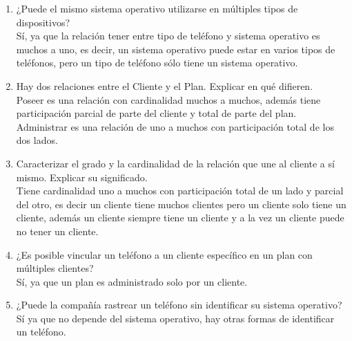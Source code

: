 \documentclass[a4paper, 12pt]{report}
\begin{document}
\begin{enumerate}
{\begin{enumerate}
{\begin{enumerate}
    		fabricante sin mantener información sobre sus teléfonos?\\
    		No, no puede, ya que desde el cliente o desde el plan, 
    		no se puede identificar al fabricante ya que no están
    		relacionados, para identificar el fabricante, se necesitan 
    		los datos del teléfono.	
    		\item ¿Puede el mismo sistema operativo utilizarse en 
    		múltiples tipos de dispositivos?\\
    		Sí, ya que la relación tener entre tipo de teléfono y 
    		sistema operativo es muchos a uno, es decir, un sistema 
    		operativo puede estar en varios tipos de teléfonos, pero
    		un tipo de teléfono sólo tiene un sistema operativo.
    		\item Hay dos relaciones entre el Cliente y el Plan. Explicar en qué difieren.\\
    		Poseer es una relación con cardinalidad muchos a muchos, 
    		además tiene participación parcial de parte del cliente y
    		total de parte del plan.\\
    		Administrar es una relación de uno a muchos con 
    		participación total de los dos lados.
    		\item Caracterizar el grado y la cardinalidad de la 
    		relación que une al cliente a sí mismo. Explicar su 
    		significado.\\
    		Tiene cardinalidad uno a muchos con participación total de
    		un lado y parcial del otro, es decir un cliente tiene muchos clientes pero un cliente solo tiene un cliente,
    		además un cliente siempre tiene un cliente y a la vez un 
    		cliente puede no tener un cliente. 
    		\item ¿Es posible vincular un teléfono a un cliente 
    		específico en un plan con múltiples clientes?\\
    		Sí, ya que un plan es administrado solo por un cliente.
    		\item ¿Puede la compañía rastrear un teléfono sin identificar su sistema operativo?\\
    		Sí ya que no depende del sistema operativo, hay otras 
    		formas de identificar un teléfono.
    		
    \end{enumerate}}
\end{enumerate}
}
\end{enumerate}


\begin{thebibliography}{20}
\end{thebibliography}
\end{document}
